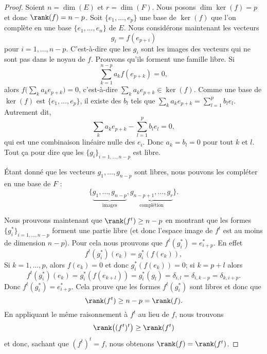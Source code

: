 \begin{proof}
	Soient \( n=\dim(E)\) et \( r=\dim(F)\).
	Nous posons \( \dim\ker(f)=p\) et donc \( \rank(f)=n-p\). Soit \( \{ e_1,\ldots, e_p \}\) une base de \( \ker(f)\) que l'on complète en une base \( \{ e_1,\ldots, e_n \}\) de \( E\). Nous considérons maintenant les vecteurs
	\begin{equation}
		g_i=f(e_{p+i})
	\end{equation}
	pour \( i=1,\ldots, n-p\). C'est-à-dire que les \( g_i\) sont les images des vecteurs qui ne sont pas dans le noyau de \( f\). Prouvons qu'ils forment une famille libre. Si
	\begin{equation}
		\sum_{k=1}^{n-p}a_kf(e_{p+k})=0,
	\end{equation}
	alors \( f\big( \sum_ka_ke_{p+k} \big)=0\), c'est-à-dire \( \sum_ka_ke_{p+k}\in\ker(f)\). Comme une base de \( \ker(f)\) est \( \{ e_1,\ldots, e_p \}\), il existe des \( b_l\) tels que \( \sum_{k}a_ke_{p+k}=\sum_{l=1}^pb_le_l\). Autrement dit,
	\begin{equation}
		\sum_{k}a_ke_{p+k}-\sum_{l=1}^pb_le_l=0,
	\end{equation}
	qui est une combinaison linéaire nulle des \( e_i\). Donc \( a_k=b_l=0\) pour tout \( k\) et \( l\). Tout ça pour dire que les \( \{ g_i \}_{i=1,\ldots, n-p}\) est libre.

	Étant donné que les vecteurs \( g_1,\ldots, g_{n-p}\) sont libres, nous pouvons les compléter en une base de \( F\) :
	\begin{equation}
		\{ \underbrace{g_1,\ldots, g_{n-p}}_{\text{images}},\underbrace{g_{n-p+1},\ldots, g_r}_{\text{complétion}} \}.
	\end{equation}

	Nous prouvons maintenant que \( \rank(f^t)\geq n-p\) en montrant que les formes \( \{ g_i^* \}_{i=1,\ldots, n-p}\) forment une partie libre (et donc l'espace image de \( f^t\) est au moins de dimension \( n-p\)). Pour cela nous prouvons que \( f^t(g_i^*)=e^*_{i+p}\). En effet
	\begin{equation}
		f^t(g^*_i)(e_k)=g_i^*(f(e_k)),
	\end{equation}
	Si \( k=1,\ldots, p\), alors \( f(e_k)=0\) et donc \( g_i^*(f(e_k))=0\); si \( k=p+l\) alors
	\begin{equation}
		f^t(g_i^*)(e_k)=g_i^*(f(e_{k+l}))=g^*_i(g_l)=\delta_{i,l}=\delta_{i,k-p}=\delta_{k,i+p}.
	\end{equation}
	Donc \( f^t(g_i^*)=e^*_{i+p}\). Cela prouve que les formes \( f^t(g_i^*)\) sont libres et donc que
	\begin{equation}
		\rank(f^t)\geq n-p=\rank(f).
	\end{equation}
	En appliquant le même raisonnement à \( f^t\) au lieu de \( f\), nous trouvons
	\begin{equation}
		\rank\big( (f^t)^t \big)\geq \rank(f^t)
	\end{equation}
	et donc, sachant que \( (f^t)^t=f\), nous obtenons \( \rank(f)=\rank(f^t)\).

\end{proof}

